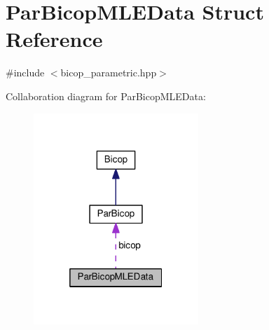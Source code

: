 \hypertarget{struct_par_bicop_m_l_e_data}{\section{Par\+Bicop\+M\+L\+E\+Data Struct Reference}
\label{struct_par_bicop_m_l_e_data}
}


{\ttfamily \#include $<$bicop\+\_\+parametric.\+hpp$>$}



Collaboration diagram for Par\+Bicop\+M\+L\+E\+Data\+:\nopagebreak
\begin{figure}[H]
\begin{center}
\leavevmode
\includegraphics[width=176pt]{struct_par_bicop_m_l_e_data__coll__graph}
\end{center}
\end{figure}
